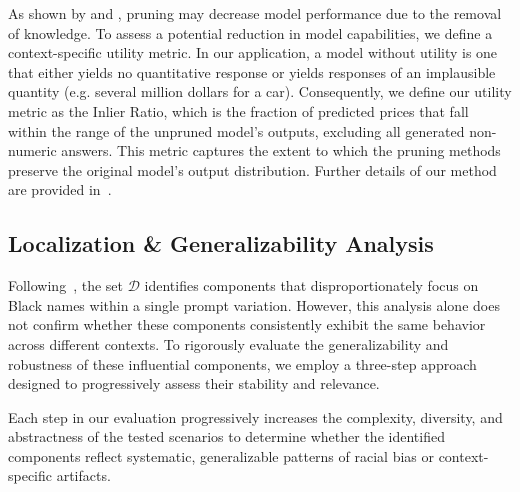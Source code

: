 
As shown by \textcite{sun2024simpleeffectivepruningapproach} and \textcite{wei2024assessingbrittlenesssafetyalignment}, pruning may decrease model performance due to the removal of knowledge. To assess a potential reduction in model capabilities, we define a context-specific utility metric. In our application, a model without utility is one that either yields no quantitative response or yields responses of an implausible quantity (e.g. several million dollars for a car). Consequently, we define our utility metric as the Inlier Ratio, which is the fraction of predicted prices that fall within the range of the unpruned model's outputs, excluding all generated non-numeric answers. This metric captures the extent to which the pruning methods preserve the original model's output distribution. Further details of our method are provided in~.


\subsection{Localization \& Generalizability Analysis}


Following~, the set $\mathcal{D}$ identifies components that disproportionately focus on Black names within a single prompt variation. However, this analysis alone does not confirm whether these components consistently exhibit the same behavior across different contexts. To rigorously evaluate the generalizability and robustness of these influential components, we employ a three-step approach designed to progressively assess their stability and relevance.

Each step in our evaluation progressively increases the complexity, diversity, and abstractness of the tested scenarios to determine whether the identified components reflect systematic, generalizable patterns of racial bias or context-specific artifacts. 


